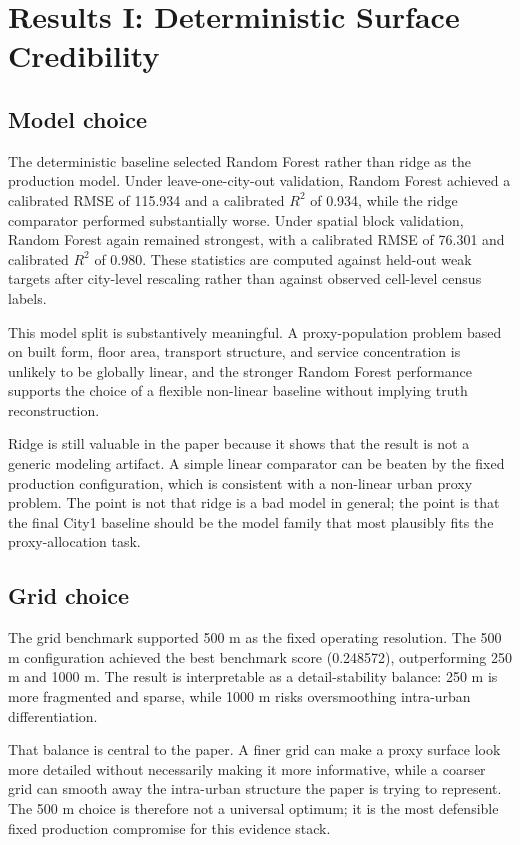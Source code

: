 \section{Results I: Deterministic Surface Credibility}

\subsection{Model choice}

The deterministic baseline selected Random Forest rather than ridge as the production model. Under leave-one-city-out validation, Random Forest achieved a calibrated RMSE of 115.934 and a calibrated $R^2$ of 0.934, while the ridge comparator performed substantially worse. Under spatial block validation, Random Forest again remained strongest, with a calibrated RMSE of 76.301 and calibrated $R^2$ of 0.980. These statistics are computed against held-out weak targets after city-level rescaling rather than against observed cell-level census labels.

This model split is substantively meaningful. A proxy-population problem based on built form, floor area, transport structure, and service concentration is unlikely to be globally linear, and the stronger Random Forest performance supports the choice of a flexible non-linear baseline without implying truth reconstruction.

Ridge is still valuable in the paper because it shows that the result is not a generic modeling artifact. A simple linear comparator can be beaten by the fixed production configuration, which is consistent with a non-linear urban proxy problem. The point is not that ridge is a bad model in general; the point is that the final City1 baseline should be the model family that most plausibly fits the proxy-allocation task.

\subsection{Grid choice}

The grid benchmark supported 500 m as the fixed operating resolution. The 500 m configuration achieved the best benchmark score (0.248572), outperforming 250 m and 1000 m. The result is interpretable as a detail-stability balance: 250 m is more fragmented and sparse, while 1000 m risks oversmoothing intra-urban differentiation.

That balance is central to the paper. A finer grid can make a proxy surface look more detailed without necessarily making it more informative, while a coarser grid can smooth away the intra-urban structure the paper is trying to represent. The 500 m choice is therefore not a universal optimum; it is the most defensible fixed production compromise for this evidence stack.

